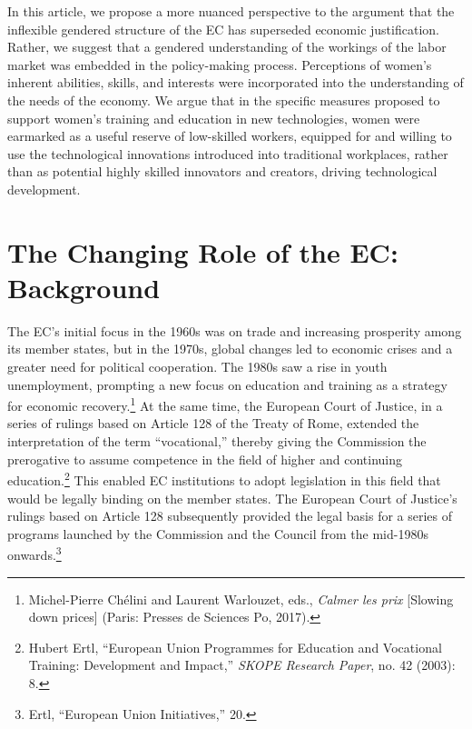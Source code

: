 \documentclass{tufte-handout}
\begin{document}
In this article, we propose a more nuanced perspective to the argument
that the inflexible gendered structure of the EC has superseded economic
justification. Rather, we suggest that a gendered understanding of the
workings of the labor market was embedded in the policy-making process.
Perceptions of women's inherent abilities, skills, and interests were
incorporated into the understanding of the needs of the economy. We
argue that in the specific measures proposed to support women's training
and education in new technologies, women were earmarked as a useful
reserve of low-skilled workers, equipped for and willing to use the
technological innovations introduced into traditional workplaces, rather
than as potential highly skilled innovators and creators, driving
technological development.

\hypertarget{the-changing-role-of-the-ec-background}{%
\section{The Changing Role of the EC:
Background}\label{the-changing-role-of-the-ec-background}}

The EC's initial focus in the 1960s was on trade and increasing
prosperity among its member states, but in the 1970s, global changes led
to economic crises and a greater need for political cooperation. The
1980s saw a rise in youth unemployment, prompting a new focus on
education and training as a strategy for economic recovery.\footnote{Michel-Pierre
  Chélini and Laurent Warlouzet, eds., \emph{Calmer les prix} {[}Slowing
  down prices{]} (Paris: Presses de Sciences Po, 2017).} At the same
time, the European Court of Justice, in a series of rulings based on
Article 128 of the Treaty of Rome, extended the interpretation of the
term ``vocational,'' thereby giving the Commission the prerogative to
assume competence in the field of higher and continuing
education.\footnote{Hubert Ertl, ``European Union Programmes for
  Education and Vocational Training: Development and Impact,''
  \emph{SKOPE Research Paper}, no. 42 (2003): 8.} This enabled EC
institutions to adopt legislation in this field that would be legally
binding on the member states. The European Court of Justice's rulings
based on Article 128 subsequently provided the legal basis for a series
of programs launched by the Commission and the Council from the
mid-1980s onwards.\footnote{Ertl, ``European Union Initiatives,'' 20.}
\end{document}
